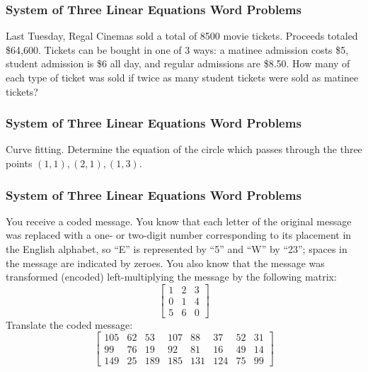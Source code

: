 \documentclass[xcolor=dvipsnames]{beamer}
\begin{document}
\begin{frame}
  \frametitle{System of Three Linear Equations Word Problems}
  {\ubung} Last Tuesday, Regal Cinemas sold a total of 8500 movie
  tickets. Proceeds totaled \$64,600. Tickets can be bought in one of
  3 ways: a matinee admission costs \$5, student admission is \$6 all
  day, and regular admissions are \$8.50. How many of each type of
  ticket was sold if twice as many student tickets were sold as
  matinee tickets?
\end{frame}

\begin{frame}
  \frametitle{System of Three Linear Equations Word Problems}
  {\ubung} Curve fitting. Determine the equation of the circle which
  passes through the three points $(1,1),(2,1),(1,3)$. 
\end{frame}

\begin{frame}
  \frametitle{System of Three Linear Equations Word Problems}
  {\ubung} You receive a coded message. You know that each letter of
  the original message was replaced with a one- or two-digit number
  corresponding to its placement in the English alphabet, so ``E'' is
  represented by ``5'' and ``W'' by ``23''; spaces in the message are
  indicated by zeroes. You also know that the message was transformed
  (encoded) left-multiplying the message by the following matrix:
\begin{equation}
  \label{eq:iephaeke}
  \left[
    \begin{array}{ccc}
    1 & 2  & 3  \\
    0 & 1  & 4  \\
    5 & 6  & 0 
  \end{array}\right]
\end{equation}
Translate the coded message:
\begin{equation}
  \label{eq:euseeyee}
  \left[
    \begin{array}{cccccccc}
    105   & 62 & 53  & 107 & 88  & 37  & 52 & 31 \\
    99    & 76 & 19  & 92  & 81  & 16  & 49 & 14 \\
    149   & 25 & 189 & 185 & 131 & 124 & 75 & 99
  \end{array}\right]
\end{equation}
\end{frame}
\end{document}
